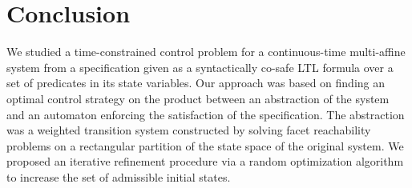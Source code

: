 \documentclass{ifacconf}
\begin{document}
\section{Conclusion}\label{sec:conclusion}


We studied a time-constrained control problem for a continuous-time multi-affine system from a specification given as a syntactically co-safe LTL formula over a set of predicates in its state variables. 
Our approach was based on finding an optimal control strategy on the product between an abstraction of the system and an automaton enforcing the satisfaction of the specification. The abstraction was a weighted transition system constructed by solving facet reachability problems on a rectangular partition of the state space of the original system. We proposed an iterative refinement procedure via a random optimization algorithm to increase the set of admissible initial states.
\end{document}
